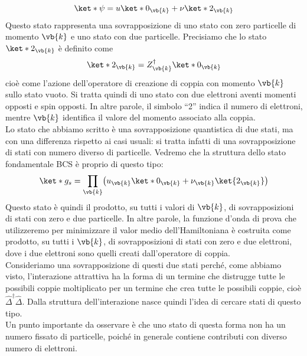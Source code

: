 \begin{equation*}
   \ket*{\psi}=u \ket*{0_{\vb{k}}} + \nu \ket*{2_{\vb{k}}}
\end{equation*}
Questo stato rappresenta una sovrapposizione di uno stato con zero particelle di momento $\vb{k}$ e uno stato con due particelle. Precisiamo che lo stato $\ket*{2_{\vb{k}}}$ è definito come
\begin{equation*}
   \ket*{2_{\vb{k}}}
   =Z^{\dag}_{\vb{k}} \ket*{0_{\vb{k}}}
\end{equation*}
cioè come l'azione dell'operatore di creazione di coppia con momento $\vb{k}$ sullo stato vuoto. Si tratta quindi di uno stato con due elettroni aventi momenti opposti e spin opposti. In altre parole, il simbolo “2” indica il numero di elettroni, mentre $\vb{k}$ identifica il valore del momento associato alla coppia.\\
Lo stato che abbiamo scritto è una sovrapposizione quantistica di due stati, ma con una differenza rispetto ai casi usuali: si tratta infatti di una sovrapposizione di stati con numero diverso di particelle. Vedremo che la struttura dello stato fondamentale BCS è proprio di questo tipo:
\begin{equation}
   \ket*{g_s}
   =\prod_{\vb{k}} \bigl( u_{\vb{k}} \ket*{0_{\vb{k}}} + \nu_{\vb{k}} \ket{2_{\vb{k}}} \bigr)
   \label{eq:BCS_trial_wavefunction}
\end{equation}
Questo stato è quindi il prodotto, su tutti i valori di $\vb{k}$, di sovrapposizioni di stati con zero e due particelle. In altre parole, la funzione d'onda di prova che utilizzeremo per minimizzare il valor medio dell'Hamiltoniana è costruita come prodotto, su tutti i $\vb{k}$, di sovrapposizioni di stati con zero e due elettroni, dove i due elettroni sono quelli creati dall'operatore di coppia.\\
Consideriamo una sovrapposizione di questi due stati perché, come abbiamo visto, l'interazione attrattiva ha la forma di un termine che distrugge tutte le possibili coppie moltiplicato per un termine che crea tutte le possibili coppie, cioè $\hat{\Delta}^{\dag}\hat{\Delta}$. Dalla struttura dell'interazione nasce quindi l'idea di cercare stati di questo tipo.\\
Un punto importante da osservare è che uno stato di questa forma non ha un numero fissato di particelle, poiché in generale contiene contributi con diverso numero di elettroni.\\
